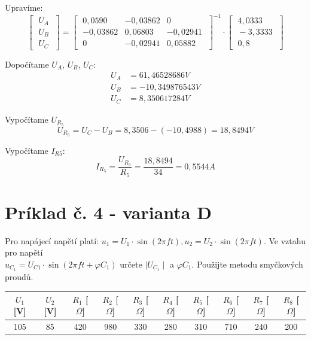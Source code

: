 \documentclass[a4paper,11pt,titlepage]{article}
\begin{document}
\vspace{5mm}

Upravíme:
$$
\begin{bmatrix}
  \; U_A \; \\
  \; U_B \; \\
  \; U_C \;
\end{bmatrix} =
\begin{bmatrix}
  \; {0,0590} & {-0,03862} & {0} \; \\
  \; {-0,03862} & {0,06803} & {-0,02941} \; \\
  \; {0} & {-0,02941} & {0,05882} \;
\end{bmatrix}^{-1} 
\cdot
\begin{bmatrix}
  \; 4,0333 \; \\
  \; -3,3333 \; \\
  \; 0,8 \;
\end{bmatrix} 
$$

\vspace{5mm}

Dopočítame $U_A$, $U_B$, $U_C$:
\begin{align*}
U_A &= 61,46528686V \\
U_B &= -10,349876543V \\
U_C &= 8,350617284V
\end{align*}

\vspace{5mm}

Vypočítame $U_{R_5}$
\[U_{R_5} = U_C - U_B = 8,3506 - (-10,4988) = 18,8494V\]

\vspace{5mm}

Vypočítame $I_{R5}$:
\[I_{R_5} = \frac{U_{R_5}}{R_5} = \frac{18,8494}{34} = 0,5544A\]

\newpage

\section{Príklad č. 4 - varianta D}

Pro napájecí napětí platí: $u_1 = U_1 \cdot \sin(2 \pi ft), u_2 = U_2 \cdot \sin(2 \pi ft).$ 
Ve vztahu pro napětí \\ $u_{C_1} = U_{C1} \cdot \sin(2 \pi ft +
\varphi C_1)$ určete $\mid U_{C_1} \mid$ a $\varphi C_1$. Použijte metodu smyčkových proudů.
\vspace{5mm}

\begin{tabular}{ |c|c|c|c|c|c|c|c|c|c| } \hline
    $U_1$ [V] & $U_2$ [V] & $R_1$ [$\Omega$] & $R_2$ [$\Omega$] & $R_3$ [$\Omega$] & $R_4$ [$\Omega$] & $R_5$ [$\Omega$] & $R_6$ [$\Omega$] & $R_7$ [$\Omega$] & $R_8$ [$\Omega$]\\ \hline
    105 & 85 & 420 & 980 & 330 & 280 & 310 & 710 & 240 & 200 \\ \hline
\end{tabular}
\end{document}
